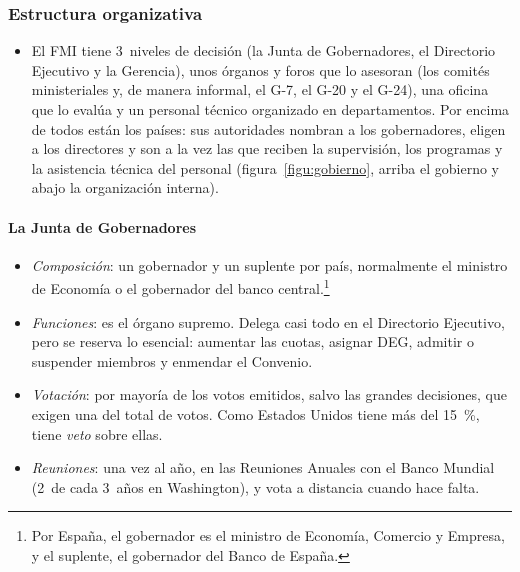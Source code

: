 \documentclass[11pt]{article}
\begin{document}
\subsubsection{Estructura organizativa}\label{sec:organizativa}

\begin{itemize}
\item El FMI tiene 3~niveles de decisión (la Junta de Gobernadores, el Directorio Ejecutivo y la Gerencia), unos órganos y foros que lo asesoran (los comités ministeriales y, de manera informal, el G-7, el G-20 y el G-24), una oficina que lo evalúa y un personal técnico organizado en departamentos. Por encima de todos están los países: sus autoridades nombran a los gobernadores, eligen a los directores y son a la vez las que reciben la supervisión, los programas y la asistencia técnica del personal (figura~\ref{figu:gobierno}, arriba el gobierno y abajo la organización interna).
\end{itemize}

\begin{infografia}[p]
\centering
\caption{El gobierno y la organización del FMI}\label{figu:gobierno}
\end{infografia}

\paragraph{La Junta de Gobernadores}

\begin{itemize}
\item \emph{Composición}: un gobernador y un suplente por país, normalmente el ministro de Economía o el gobernador del banco central.\footnote{Por España, el gobernador es el ministro de Economía, Comercio y Empresa, y el suplente, el gobernador del Banco de España\nocite{BdE2025FMI}.}
\item \emph{Funciones}: es el órgano supremo. Delega casi todo en el Directorio Ejecutivo, pero se reserva lo esencial: aumentar las cuotas, asignar DEG, admitir o suspender miembros y enmendar el Convenio.
\item \emph{Votación}: por mayoría de los votos emitidos, salvo las grandes decisiones, que exigen una  del total de votos. Como Estados Unidos tiene más del 15~\%, tiene \emph{veto} sobre ellas.
\item \emph{Reuniones}: una vez al año, en las Reuniones Anuales con el Banco Mundial (2~de cada 3~años en Washington), y vota a distancia cuando hace falta.
\end{itemize}
\end{document}
